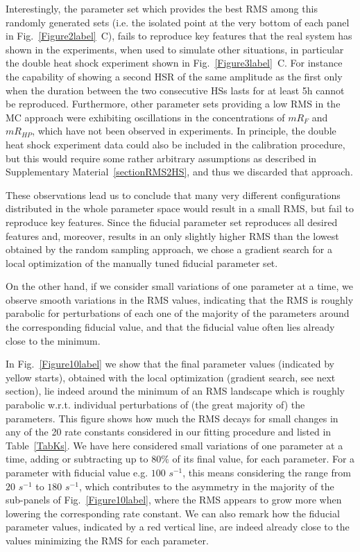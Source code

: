 \documentclass[oneside, 10pt, a4paper, twocolumn]{article}
\begin{document}
{Interestingly}, the parameter set which provides the best RMS among this randomly 
generated {sets (i.e. the isolated point at the very bottom of each panel in Fig.~\ref{Figure2label}~C), 
fails to reproduce key features that the real system has shown in the experiments, when used 
to simulate other situations, in particular the double heat shock experiment shown in Fig.~\ref{Figure3label}~C.
For instance the capability of showing a second HSR of the same amplitude as the first only when the duration between the
two consecutive HSs lasts for at least 5h cannot be reproduced.
Furthermore, other parameter sets providing a low RMS in the MC approach were exhibiting oscillations in the concentrations 
of $mR_{F}$ and $mR_{HP}$, which have not been observed in experiments. 
In principle, the double heat shock experiment data could also be included in the calibration procedure, but this would require some 
rather arbitrary assumptions as described in Supplementary Material~\ref{sectionRMS2HS}, and thus we discarded that approach.}

{These observations lead us to conclude that many very different configurations distributed in the whole parameter space would 
result in a small RMS, but fail to reproduce key features. Since the fiducial parameter set reproduces all desired features and, moreover,
results in an only slightly higher RMS than the lowest obtained by the random sampling approach, we chose a gradient search for a
local optimization of the manually tuned fiducial parameter set.}


On the other hand, if we consider small variations of one parameter at a time, we observe smooth variations in the RMS values, indicating that the RMS is roughly parabolic for perturbations of each one of the majority of the parameters around the corresponding fiducial value, and that the fiducial value often lies {already} close to the minimum. 

In Fig.~\ref{Figure10label} we show that the final parameter values (indicated by yellow starts), obtained with the local optimization (gradient search, see next section), lie indeed around the minimum of an RMS landscape which is roughly parabolic w.r.t. individual perturbations of (the great majority of) the parameters. {This figure shows how much the RMS decays for small changes in any of the 20 rate constants considered in our fitting procedure and listed in Table~\ref{TabKs}. We have here considered small variations of one parameter at a time, adding or subtracting up to $80\%$ of its final value, for each parameter. For a parameter with fiducial value e.g. $100$ $s^{-1}$, this means considering the range from $20$ $s^{-1}$ to $180$ $s^{-1}$, which contributes to the asymmetry in the majority of the sub-panels of Fig.~\ref{Figure10label}, where the RMS appears to grow more when lowering the corresponding rate constant. We can also remark how the fiducial parameter values, indicated by a red vertical line, are indeed already close to the values minimizing the RMS for each parameter.} 
\end{document}
